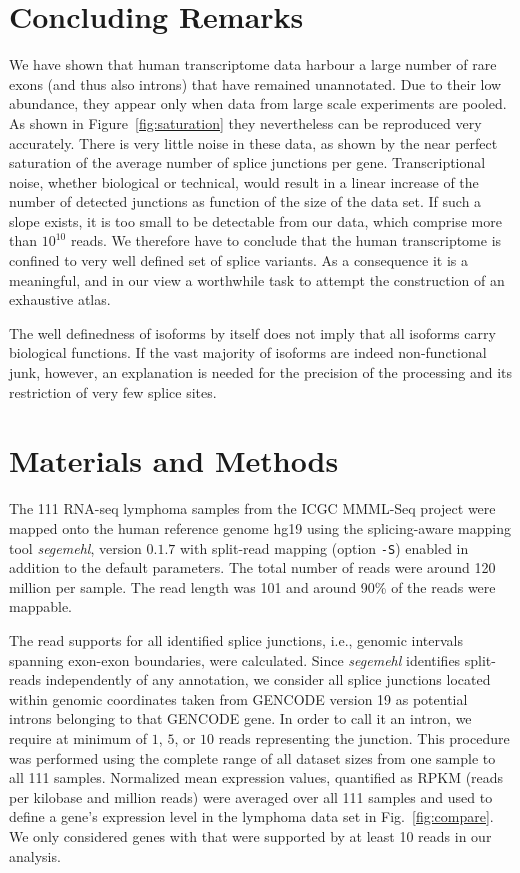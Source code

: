 \documentclass[ncrna,article,submit,moreauthors,pdftex,10pt,a4paper]{mdpi}
\begin{document}
\section{Concluding Remarks} 

We have shown that human transcriptome data harbour a large number of rare
exons (and thus also introns) that have remained unannotated. Due to their
low abundance, they appear only when data from large scale experiments are
pooled. As shown in Figure~\ref{fig:saturation} they nevertheless can be
reproduced very accurately. There is very little noise in these data, as
shown by the near perfect saturation of the average number of splice
junctions per gene. Transcriptional noise, whether biological or technical,
would result in a linear increase of the number of detected junctions as
function of the size of the data set. If such a slope exists, it is too
small to be detectable from our data, which comprise more than $10^{10}$
reads. We therefore have to conclude that the human transcriptome is
confined to very well defined set of splice variants. As a consequence it
is a meaningful, and in our view a worthwhile task to attempt the
construction of an exhaustive atlas.

The well definedness of isoforms by itself does not imply that all isoforms
carry biological functions. If the vast majority of isoforms are indeed
non-functional junk, however, an explanation is needed for the precision of
the processing and its restriction of very few splice sites.

\section{Materials and Methods}

The 111 RNA-seq lymphoma samples from the ICGC MMML-Seq project
\cite{Richter:12a} were mapped onto the human reference genome hg19 using
the splicing-aware mapping tool \textit{segemehl}, version $0.1.7$
\cite{Hoffmann:09a,Hoffmann:14a} with split-read mapping (option
\texttt{-S}) enabled in addition to the default parameters. The total
number of reads were around 120 million per sample. The read length was 101
and around 90\% of the reads were mappable.

The read supports for all identified splice junctions, i.e., genomic
intervals spanning exon-exon boundaries, were calculated. Since
\textit{segemehl} identifies split-reads independently of any annotation,
we consider all splice junctions located within genomic coordinates taken
from GENCODE version 19 as potential introns belonging to that GENCODE
gene. In order to call it an intron, we require at minimum of $1$, $5$, or
$10$ reads representing the junction.  This procedure was performed using
the complete range of all dataset sizes from one sample to all 111 samples.
Normalized mean expression values, quantified as RPKM (reads per kilobase
and million reads) were averaged over all 111 samples and used to define a
gene's expression level in the lymphoma data set in Fig.\
\ref{fig:compare}. We only considered genes with that were supported by at
least 10 reads in our analysis.
\end{document}
